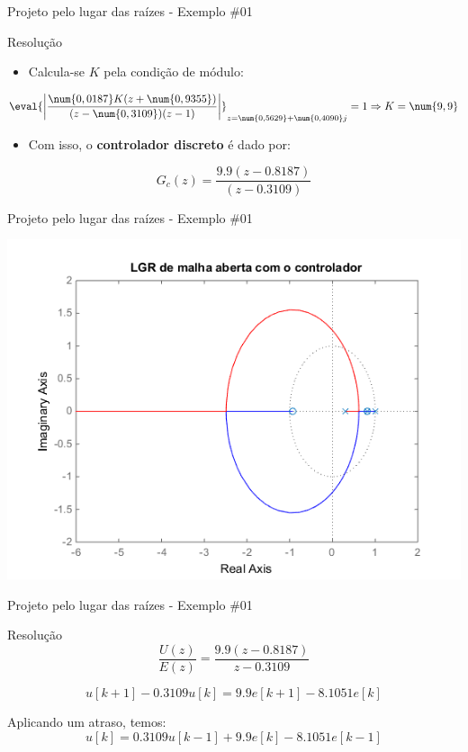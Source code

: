 \begin{frame}{Projeto pelo lugar das raízes - Exemplo \#01}
\begin{block}{Resolução}
\begin{itemize}
    \item Calcula-se $ K $ pela condição de módulo:
\end{itemize}
	\[ \eval{\left| \frac{\num{0,0187}K(z+\num{0,9355})}{(z-\num{0,3109})(z-1)} \right| }_{z=\num{0,5629}+\num{0,4090}j}=1\Rightarrow K=\num{9,9} \]
\begin{itemize}
    \item Com isso, o \textbf{controlador discreto} é dado por:
\end{itemize}
	\[ G_c(z)=\dfrac{\num{9,9}(z-\num{0,8187})}{(z-\num{0,3109})} \]
\end{block}
\end{frame}

\begin{frame}{Projeto pelo lugar das raízes - Exemplo \#01}
\centerline{\includegraphics[width=0.8\linewidth]{Figuras/Ch11/fig8.png}}
\end{frame}

\begin{frame}{Projeto pelo lugar das raízes - Exemplo \#01}
\begin{block}{Resolução}
$$\dfrac{U(z)}{E(z)}=\dfrac{\num{9,9}(z-\num{0,8187})}{z-\num{0,3109}}$$

$$u[k+1] - \num{0,3109} u[k]=\num{9,9}e[k+1]-\num{8,1051}e[k]$$

Aplicando um atraso, temos:\\
$$u[k]=\num{0,3109}u[k-1]+\num{9,9}e[k]-\num{8,1051}e[k-1]$$
\end{block}
\end{frame}


